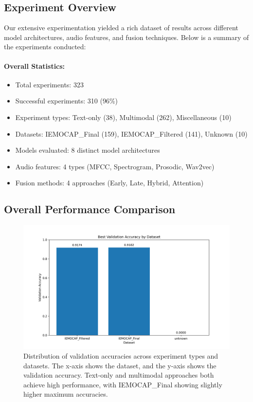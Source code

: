 \documentclass[12pt]{article}
\begin{document}
\subsection{Experiment Overview}
Our extensive experimentation yielded a rich dataset of results across different model architectures, audio features, and fusion techniques. Below is a summary of the experiments conducted:

\paragraph{Overall Statistics:}
\begin{itemize}
    \item Total experiments: 323
    \item Successful experiments: 310 (96\%)
    \item Experiment types: Text-only (38), Multimodal (262), Miscellaneous (10)
    \item Datasets: IEMOCAP\_Final (159), IEMOCAP\_Filtered (141), Unknown (10)
    \item Models evaluated: 8 distinct model architectures
    \item Audio features: 4 types (MFCC, Spectrogram, Prosodic, Wav2vec)
    \item Fusion methods: 4 approaches (Early, Late, Hybrid, Attention)
\end{itemize}

\subsection{Overall Performance Comparison}
\begin{figure}[h]
    \centering
    \includegraphics[width=0.8\linewidth]{Figures/dataset_comparison.png}
    \caption{Distribution of validation accuracies across experiment types and datasets. The x-axis shows the dataset, and the y-axis shows the validation accuracy. Text-only and multimodal approaches both achieve high performance, with IEMOCAP\_Final showing slightly higher maximum accuracies.}
    \label{fig:overall_performance}
\end{figure}
\end{document}
